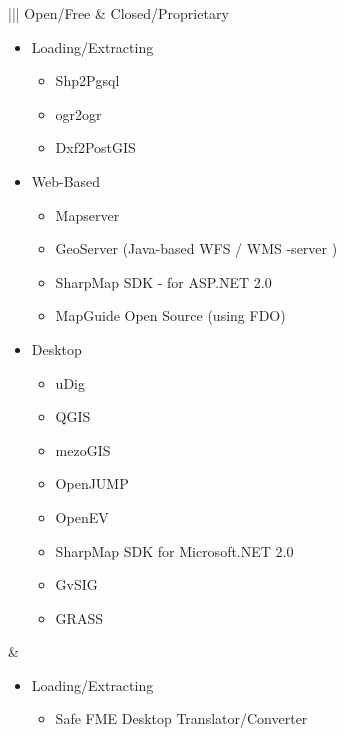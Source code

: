 \documentclass[a4paper,11pt,english]{sphinxmanual}
\begin{document}
\begin{savenotes}\sphinxattablestart
\centering
\begin{tabular}[t]{|*{2}{|}}
\hline
\sphinxstyletheadfamily 
Open/Free
&\sphinxstyletheadfamily 
Closed/Proprietary
\\
\hline\begin{itemize}
\item {} 
Loading/Extracting
\begin{itemize}
\item {} 
Shp2Pgsql

\item {} 
ogr2ogr

\item {} 
Dxf2PostGIS

\end{itemize}

\item {} 
Web-Based
\begin{itemize}
\item {} 
Mapserver

\item {} 
GeoServer (Java-based WFS / WMS -server )

\item {} 
SharpMap SDK - for ASP.NET 2.0

\item {} 
MapGuide Open Source (using FDO)

\end{itemize}

\item {} 
Desktop
\begin{itemize}
\item {} 
uDig

\item {} 
QGIS

\item {} 
mezoGIS

\item {} 
OpenJUMP

\item {} 
OpenEV

\item {} 
SharpMap SDK for Microsoft.NET 2.0

\item {} 
GvSIG

\item {} 
GRASS

\end{itemize}

\end{itemize}
&\begin{itemize}
\item {} 
Loading/Extracting
\begin{itemize}
\item {} 
Safe FME Desktop Translator/Converter


\end{itemize}
\end{itemize}
\end{tabular}
\end{savenotes}
\end{document}

